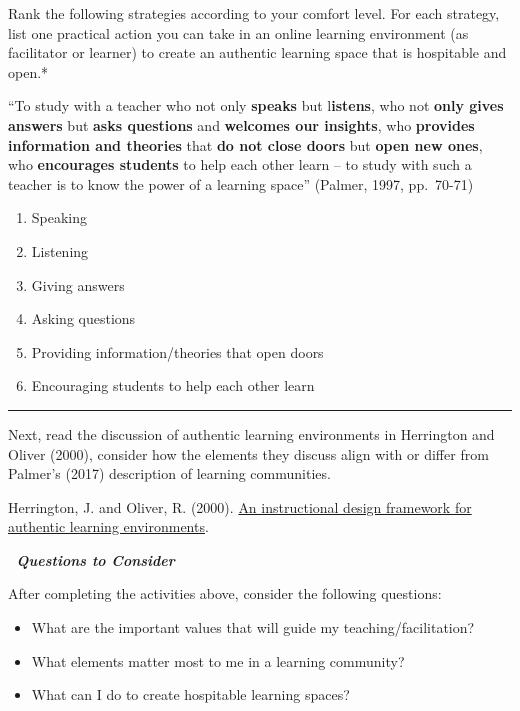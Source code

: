 \documentclass[
]{book}
\providecommand{\tightlist}{%
  \setlength{\itemsep}{0pt}\setlength{\parskip}{0pt}}
\begin{document}
\begin{reflect}
Rank the following strategies according to your comfort level. For each
strategy, list one practical action you can take in an online learning
environment (as facilitator or learner) to create an authentic learning
space that is hospitable and open.*

``To study with a teacher who not only \textbf{speaks} but
l\textbf{istens}, who not \textbf{only gives answers} but \textbf{asks
questions} and \textbf{welcomes our insights}, who \textbf{provides
information and theories} that \textbf{do not close doors} but
\textbf{open new ones}, who \textbf{encourages students} to help each
other learn -- to study with such a teacher is to know the power of a
learning space'' (Palmer, 1997, pp.~70-71)

\begin{enumerate}
\def\labelenumi{\arabic{enumi}.}
\item
  Speaking
\item
  Listening
\item
  Giving answers
\item
  Asking questions
\item
  Providing information/theories that open doors
\item
  Encouraging students to help each other learn
\end{enumerate}

\begin{center}\rule{0.5\linewidth}{0.5pt}\end{center}

Next, read the discussion of authentic learning environments in
Herrington and Oliver (2000), consider how the elements they discuss
align with or differ from Palmer's (2017) description of learning
communities.

Herrington, J. and Oliver, R. (2000).
\href{https://ro.uow.edu.au/edupapers/31/}{An instructional design
framework for authentic learning environments}.

💭 \textbf{\emph{Questions to Consider}}

After completing the activities above, consider the following questions:

\begin{itemize}
\tightlist
\item
  What are the important values that will guide my
  teaching/facilitation?
\item
  What elements matter most to me in a learning community?
\item
  What can I do to create hospitable learning spaces?
\end{itemize}
\end{reflect}
\end{document}
